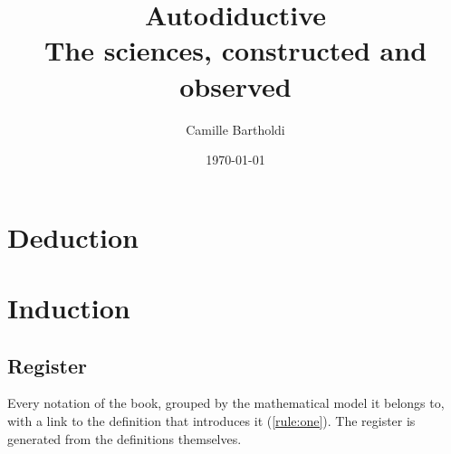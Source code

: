\documentclass[11pt,openany]{book}
\title{\textbf{Autodiductive}\\[1ex]
  \large The sciences, constructed and observed}
\author{Camille Bartholdi}
\date{\today}
\begin{document}
\frontmatter
\maketitle
\tableofcontents


\mainmatter

\part{Deduction}
\label{part:deduction}










\part{Induction}
\label{part:induction}



\backmatter

\chapter{Register}
\label{register}

Every notation of the book, grouped by the mathematical model it belongs to, with
a link to the definition that introduces it (\cref{rule:one}). The register is
generated from the definitions themselves.

\printregister
\end{document}
